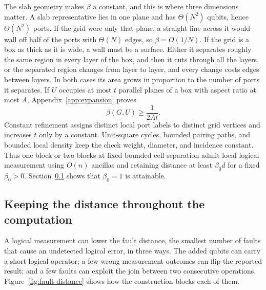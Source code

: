 The slab geometry makes $\beta$ a constant, and this is where three
dimensions matter.  A slab representative lies in one plane and has
$\Theta(N^2)$ qubits, hence $\Theta(N^2)$ ports.  If the grid were only that
plane, a straight line across it would wall off half of the ports with
$\Theta(N)$ edges, so $\beta=O(1/N)$.  If the grid is a box as thick as it is
wide, a wall must be a surface.  Either it separates roughly the same region
in every layer of the box, and then it cuts through all the layers, or the
separated region changes from layer to layer, and every change costs edges
between layers.  In both cases its area grows in proportion to the number of
ports it separates.  If $U$
occupies at most $t$ parallel planes of a box with aspect ratio at most $A$,
Appendix~\ref{app:expansion} proves
\begin{equation}
 \beta(G,U)\ge\frac{1}{2At}.
 \label{eq:grid-bound}
\end{equation}
Constant refinement assigns distinct local port labels to distinct grid
vertices and increases $t$ only by a constant. Unit-square cycles, bounded
pairing paths, and bounded local density keep the check weight, diameter,
and incidence constant. Thus one block or two blocks at fixed bounded cell
separation admit local logical measurement using $O(n)$ ancillas and retaining
distance at least $\beta_0d$ for a fixed $\beta_0>0$. Section~\ref{sec:distance-floor}
shows that $\beta_0=1$ is attainable.

\subsection{Keeping the distance throughout the computation}
\label{sec:distance-floor}
A logical measurement can lower the fault distance, the smallest number of
faults that cause an undetected logical error, in three ways.  The added
qubits can carry a short logical operator; a few wrong measurement outcomes
can flip the reported result; and a few faults can exploit the join between
two consecutive operations.  Figure~\ref{fig:fault-distance} shows how the
construction blocks each of them.


